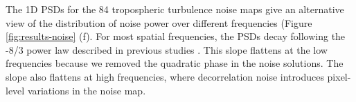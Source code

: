 \documentclass{utexasthesis}
\begin{document}
The 1D PSDs for the 84 tropospheric turbulence noise maps give an alternative view of the distribution of noise power over different frequencies (Figure \ref{fig:results-noise} (f). For most spatial frequencies, the PSDs decay following the -8/3 power law described in previous studies \cite{Hanssen2001RadarInterferometryData, Onn2006ModelingWaterVapor}. This slope flattens at the low frequencies because we removed the quadratic phase in the noise solutions. The slope also flattens at high frequencies, where decorrelation noise introduces pixel-level variations in the noise map.
\end{document}
